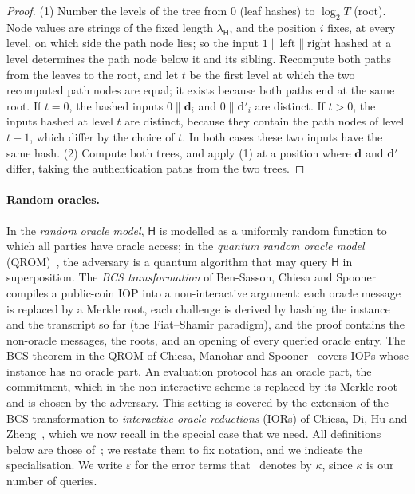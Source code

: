 \begin{proof}
(1) Number the levels of the tree from $0$ (leaf hashes) to $\log_2 T$ (root). Node values are strings of the fixed length $\lambda_{\mathsf{H}}$, and the position $i$ fixes, at every level, on which side the path node lies; so the input $1\|\text{left}\|\text{right}$ hashed at a level determines the path node below it and its sibling.
Recompute both paths from the leaves to the root, and let $t$ be the first level at which the two recomputed path nodes are equal; it exists because both paths end at the same root.
If $t = 0$, the hashed inputs $0\|\mathbf{d}_i$ and $0\|\mathbf{d}'_i$ are distinct. If $t > 0$, the inputs hashed at level $t$ are distinct, because they contain the path nodes of level $t-1$, which differ by the choice of $t$. In both cases these two inputs have the same hash.
(2) Compute both trees, and apply (1) at a position where $\mathbf{d}$ and $\mathbf{d}'$ differ, taking the authentication paths from the two trees.
\end{proof}

\paragraph{Random oracles.}
In the \emph{random oracle model}, $\mathsf{H}$ is modelled as a uniformly random function to which all parties have oracle access; in the \emph{quantum random oracle model} (QROM)~\cite{BDFLSZ11}, the adversary is a quantum algorithm that may query $\mathsf{H}$ in superposition.
The \emph{BCS transformation} of Ben-Sasson, Chiesa and Spooner~\cite{BCS16} compiles a public-coin IOP into a non-interactive argument:
each oracle message is replaced by a Merkle root, each challenge is derived by hashing the instance and the transcript so far (the Fiat--Shamir paradigm), and the proof contains the non-oracle messages, the roots, and an opening of every queried oracle entry.
The BCS theorem in the QROM of Chiesa, Manohar and Spooner~\cite[Theorem~8.6]{CMS19} covers IOPs whose instance has no oracle part.
An evaluation protocol has an oracle part, the commitment, which in the non-interactive scheme is replaced by its Merkle root and is chosen by the adversary.
This setting is covered by the extension of the BCS transformation to \emph{interactive oracle reductions} (IORs) of Chiesa, Di, Hu and Zheng~\cite{CDHZ25}, which we now recall in the special case that we need.
All definitions below are those of~\cite{CDHZ25}; we restate them to fix notation, and we indicate the specialisation.
We write $\varepsilon$ for the error terms that~\cite{CDHZ25} denotes by $\kappa$, since $\kappa$ is our number of queries.

